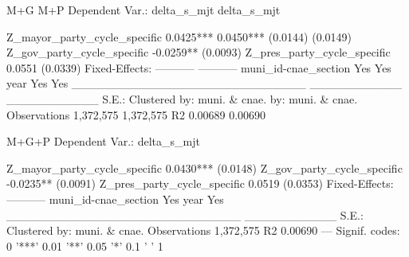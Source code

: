                                            M+G               M+P
Dependent Var.:                    delta_s_mjt       delta_s_mjt
                                                                
Z_mayor_party_cycle_specific         0.0425***         0.0450***
                                    (0.0144)          (0.0149)  
Z_gov_party_cycle_specific          -0.0259**                   
                                    (0.0093)                    
Z_pres_party_cycle_specific                            0.0551   
                                                      (0.0339)  
Fixed-Effects:                     -----------       -----------
muni_id-cnae_section                       Yes               Yes
year                                       Yes               Yes
____________________________       ___________       ___________
S.E.: Clustered              by: muni. & cnae. by: muni. & cnae.
Observations                         1,372,575         1,372,575
R2                                     0.00689           0.00690

                                         M+G+P
Dependent Var.:                    delta_s_mjt
                                              
Z_mayor_party_cycle_specific         0.0430***
                                    (0.0148)  
Z_gov_party_cycle_specific          -0.0235** 
                                    (0.0091)  
Z_pres_party_cycle_specific          0.0519   
                                    (0.0353)  
Fixed-Effects:                     -----------
muni_id-cnae_section                       Yes
year                                       Yes
____________________________       ___________
S.E.: Clustered              by: muni. & cnae.
Observations                         1,372,575
R2                                     0.00690
---
Signif. codes: 0 '***' 0.01 '**' 0.05 '*' 0.1 ' ' 1
